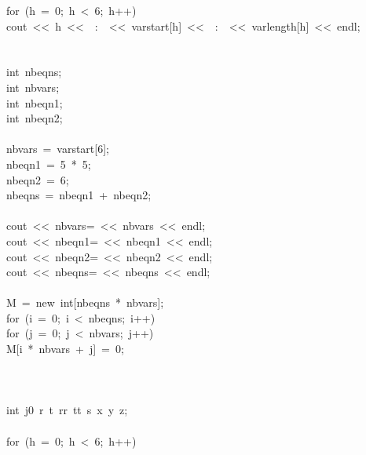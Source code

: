 \begin{tabbing}
\>for\ (h\ =\ 0;\ h\ <\ 6;\ h++)\ \\[0pt]
\>\>cout\ <<\ h\ <<\ \ :\ \ <<\ varstart[h]\ <<\ \ :\ \ <<\ varlength[h]\ <<\ endl;\\[0pt]
\>\>\\[0pt]
\>\\[0pt]
\>int\ nbeqns;\\[0pt]
\>int\ nbvars;\\[0pt]
\>int\ nbeqn1;\\[0pt]
\>int\ nbeqn2;\\[0pt]
\\[0pt]
\>nbvars\ =\ varstart[6];\\[0pt]
\>nbeqn1\ =\ 5\ *\ 5;\\[0pt]
\>nbeqn2\ =\ 6;\\[0pt]
\>nbeqns\ =\ nbeqn1\ +\ nbeqn2;\\[0pt]
\>\\[0pt]
\>cout\ <<\ nbvars=\ <<\ nbvars\ <<\ endl;\\[0pt]
\>cout\ <<\ nbeqn1=\ <<\ nbeqn1\ <<\ endl;\\[0pt]
\>cout\ <<\ nbeqn2=\ <<\ nbeqn2\ <<\ endl;\\[0pt]
\>cout\ <<\ nbeqns=\ <<\ nbeqns\ <<\ endl;\\[0pt]
\\[0pt]
\>M\ =\ new\ int[nbeqns\ *\ nbvars];\\[0pt]
\>for\ (i\ =\ 0;\ i\ <\ nbeqns;\ i++)\ \\[0pt]
\>\>for\ (j\ =\ 0;\ j\ <\ nbvars;\ j++)\ \\[0pt]
\>\>\>M[i\ *\ nbvars\ +\ j]\ =\ 0;\\[0pt]
\>\>\>\\[0pt]
\>\>\\[0pt]
\>\\[0pt]
\>int\ j0\ r\ t\ rr\ tt\ s\ x\ y\ z;\\[0pt]
\\[0pt]
\>for\ (h\ =\ 0;\ h\ <\ 6;\ h++)\ \\[0pt]

\end{tabbing}
